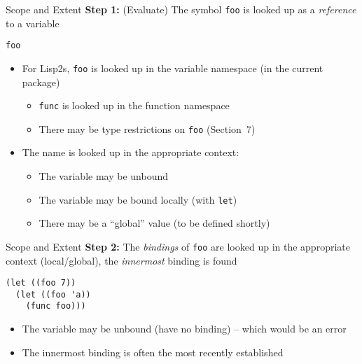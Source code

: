 \documentclass[presentation]{beamer}
\begin{document}
\begin{frame}[fragile]{Scope and Extent}
\textbf{Step 1:} (Evaluate) The symbol \texttt{foo} is looked up as a \emph{reference} to a variable
\begin{verbatim}
foo
\end{verbatim}
\begin{itemize}
\item For Lisp2s, \texttt{foo} is looked up in the variable namespace (in the current package)
  \begin{itemize}
  \item \texttt{func} is looked up in the function namespace
  \item There may be type restrictions on \texttt{foo} (Section~7)
  \end{itemize}
\item The name is looked up in the appropriate context:
  \begin{itemize}
  \item The variable may be unbound
  \item The variable may be bound locally (with \texttt{let})
  \item There may be a ``global'' value (to be defined shortly)
  \end{itemize}

\end{itemize}

\end{frame}

\begin{frame}[fragile]{Scope and Extent}
\textbf{Step 2:} The \emph{bindings} of \texttt{foo} are looked up in the appropriate context (local/global), the \emph{innermost} binding is found
\begin{verbatim}
(let ((foo 7))
  (let ((foo 'a))
    (func foo)))
\end{verbatim}
\begin{itemize}
\item The variable may be unbound (have no binding) -- which would be an error
\item The innermost binding is often the most recently established
\end{itemize}

\end{frame}
\end{document}

